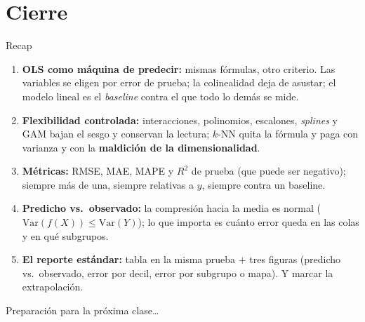 \documentclass{beamer}
\newcommand{\Var}{\mathrm{Var}}
\newcommand{\1}{\mathbb{I}}
\begin{document}
\section{Cierre}
\begin{frame}[noframenumbering]
\tableofcontents[currentsection]
\end{frame}

\begin{frame}{Recap}
\small
\begin{enumerate}\itemsep6pt
  \item \textbf{OLS como máquina de predecir:} mismas fórmulas, otro criterio. Las variables se eligen por error de prueba; la colinealidad deja de asustar; el modelo lineal es el \emph{baseline} contra el que todo lo demás se mide.
  \item \textbf{Flexibilidad controlada:} interacciones, polinomios, escalones, \emph{splines} y GAM bajan el sesgo y conservan la lectura; $k$-NN quita la fórmula y paga con varianza y con la \textbf{maldición de la dimensionalidad}.
  \item \textbf{Métricas:} RMSE, MAE, MAPE y $R^2$ de prueba (que puede ser negativo); siempre más de una, siempre relativas a $y$, siempre contra un baseline.
  \item \textbf{Predicho vs.\ observado:} la compresión hacia la media es normal ($\Var(f(X)) \leq \Var(Y)$); lo que importa es cuánto error queda en las colas y en qué subgrupos.
  \item \textbf{El reporte estándar:} tabla en la misma prueba $+$ tres figuras (predicho vs.\ observado, error por decil, error por subgrupo o mapa). Y marcar la extrapolación.
\end{enumerate}
\end{frame}

\begin{frame}
\vspace{2.0cm}
\Large{Preparación para la próxima clase\ldots}
\end{frame}

\end{document}
